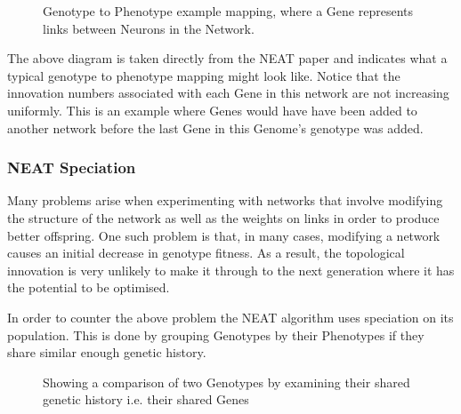 \documentclass[]{Learning-to-Play-Wolfenstein-thesis}
\begin{document}
\begin{figure}[h]
\centering
\fboxsep 2mm
\caption{\label{fig:NEAT_encoding} Genotype to Phenotype example mapping, where a Gene represents links between Neurons in the Network.}
\end{figure} 
The above diagram is taken directly from the NEAT paper and indicates what a typical genotype to phenotype mapping might look like. Notice that the innovation numbers associated with each Gene in this network are not increasing uniformly. This is an example where Genes would have have been added to another network before the last Gene in this Genome's genotype was added.

\subsubsection{NEAT Speciation}
Many problems arise when experimenting with networks that involve modifying the structure of the network as well as the weights on links in order to produce better offspring. One such problem is that, in many cases, modifying a network causes an initial decrease in genotype fitness. As a result, the topological innovation is very unlikely to make it through to the next generation where it has the potential to be optimised. 

In order to counter the above problem the NEAT algorithm uses speciation on its population. This is done by grouping Genotypes by their Phenotypes if they share similar enough genetic history. 

\begin{figure}[h]
\centering
\fboxsep 2mm
\caption{\label{fig:NEAT_innovation} Showing a comparison of two Genotypes by examining their shared genetic history i.e. their shared Genes}
\end{figure} 
\end{document}

